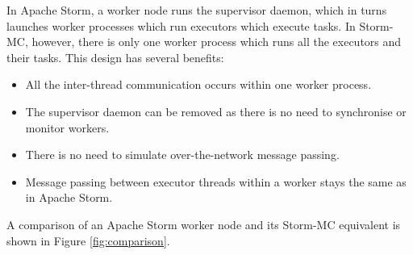 In Apache Storm, a worker node runs the supervisor daemon, which in turns launches worker processes which run executors which execute tasks. In Storm-MC, however, there is only one worker process which runs all the executors and their tasks. This design has several benefits:

\begin{itemize}
	\item All the inter-thread communication occurs within one worker process.
	\item The supervisor daemon can be removed as there is no need to synchronise or monitor workers.
	\item There is no need to simulate over-the-network message passing.
	\item Message passing between executor threads within a worker stays the same as in Apache Storm.
\end{itemize}

A comparison of an Apache Storm worker node and its Storm-MC equivalent is shown in Figure \ref{fig:comparison}.

